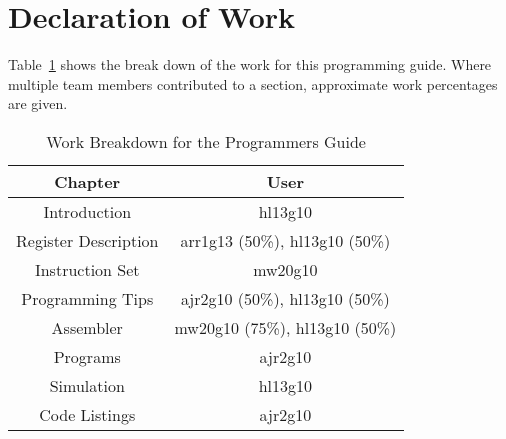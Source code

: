 
\section{Declaration of Work}

Table~\ref{tab:work} shows the break down of the work for this programming guide. 
Where multiple team members contributed to a section, approximate work percentages are given. 

\begin{table}
\caption{Work Breakdown for the Programmers Guide}
\label{tab:work}
\centering
\begin{tabular}{|c|c|} \hline
Chapter			&	User	\\ \hline
Introduction		&	hl13g10 \\	
Register Description	&	arr1g13 (50\%), hl13g10 (50\%) \\
Instruction Set		&	mw20g10	\\
Programming Tips	&	ajr2g10 (50\%), hl13g10 (50\%) \\		
Assembler		&	mw20g10 (75\%), hl13g10 (50\%) \\		
Programs		&	ajr2g10 \\
Simulation		&	hl13g10 \\
Code Listings		&	ajr2g10 \\ \hline
\end{tabular}
\end{table}

